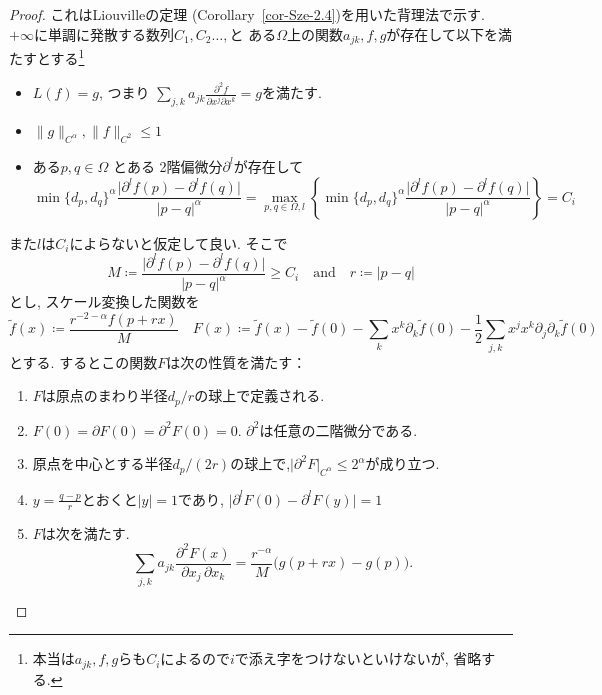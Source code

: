 \documentclass[dvipdfmx,a4paper,11pt]{article} %
\theoremstyle{definition}
\theoremstyle{remark}
\numberwithin{equation}{section}
\begin{document}
\begin{proof}
これはLiouvilleの定理 (Corollary~\ref{cor-Sze-2.4})を用いた背理法で示す. 
$+ \infty$に単調に発散する数列$C_1, C_2 \ldots, $と
ある$\Omega$上の関数$a_{jk},f,g$が存在して以下を満たすとする\footnote{本当は$a_{jk},f,g$らも$C_i$によるので$i$で添え字をつけないといけないが, 省略する. }
\begin{itemize}
\item $L(f)=g$, つまり
\(
\sum_{j,k} a_{jk}\frac{\partial^2 f}{\partial x^j\partial x^k}=g
\)を満たす.
\item  $\lVert g\rVert_{C^\alpha},\lVert f\rVert_{C^2}\leq 1$ 
\item 
ある$p,q\in\Omega$ 
とある 2階偏微分$\partial^l$が存在して
\begin{equation}
\label{eq-Sze-22}
\min\{d_p,d_q\}^\alpha\frac{\lvert\partial^l f(p)-\partial^l f(q)\rvert}{\lvert p-q\rvert^\alpha}
= \max_{p,q \in \Omega, l} 
\left\{\min\{d_p,d_q\}^\alpha\frac{\lvert\partial^l f(p)-\partial^l f(q)\rvert}{\lvert p-q\rvert^\alpha}\right\}
= C_i
\end{equation}
\end{itemize}
また$l$は$C_i$によらないと仮定して良い. そこで
$$
M \coloneqq \frac{\lvert\partial^l f(p)-\partial^l f(q)\rvert}{\lvert p-q\rvert^\alpha}
\ge C_i
\quad \text{and} \quad
r \coloneqq \lvert p-q\rvert
$$
とし, スケール変換した関数を
\[
\tilde f(x) \coloneqq 
\frac{r^{-2-\alpha}f(p+rx)}{M}
\quad
F(x)\coloneqq \tilde f(x)-\tilde f(0)-\sum_k x^k\partial_k\tilde f(0)-\frac12\sum_{j,k}x^jx^k\partial_j\partial_k\tilde f(0)
\]
とする. するとこの関数$F$は次の性質を満たす：
\begin{enumerate}
\item $F$は原点のまわり半径$d_p/r$の球上で定義される. 
\item $F(0)=\partial F(0)=\partial^2 F(0)=0$.  $\partial^2$は任意の二階微分である.
\item  原点を中心とする半径$d_p/(2r)$の球上で,$\lvert\partial^2 F\rvert_{C^\alpha}\leq 2^\alpha$が成り立つ.
\item  $y=\frac{q-p}{r}$とおくと$\lvert y\rvert=1$であり,
\(
\bigl\lvert\partial^l F(0)-\partial^l F(y)\bigr\rvert=1
\)
\item $F$は次を満たす. 
\[
\sum_{j,k} a_{jk}\frac{\partial^2 F(x)}{\partial x_j\,\partial x_k}=
\frac{r^{-\alpha}}{M}\bigl(g(p+rx)-g(p)\bigr).
\]
\end{enumerate}


\end{proof}
\end{document}
